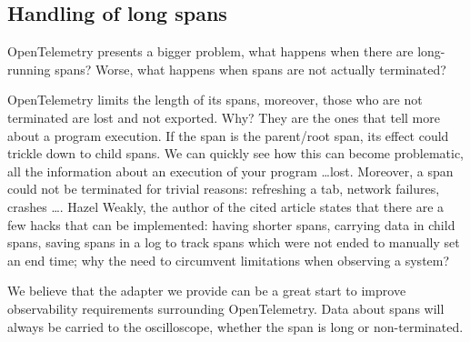     \subsection{Handling of long spans}
        OpenTelemetry presents a bigger problem, what happens when there are long-running spans? Worse, what happens when spans are not actually terminated?
        
        OpenTelemetry limits the length of its spans, moreover, those who are not terminated are lost and not exported. Why? They are the ones that tell more about a program execution.
        If the span is the parent/root span, its effect could trickle down to child spans. We can quickly see how this can become problematic, all the information about an execution of your program \dots lost. Moreover, a span could not be terminated for trivial reasons: refreshing a tab, network failures, crashes \dots \cite{otel-l}. Hazel Weakly, the author of the cited article states that there are a few hacks that can be implemented: having shorter spans, carrying data in child spans, saving spans in a log to track spans which were not ended to manually set an end time; why the need to circumvent limitations when observing a system?

     We believe that the adapter we provide can be a great start to improve observability requirements surrounding OpenTelemetry. Data about spans will always be carried to the oscilloscope, whether the span is long or non-terminated.
